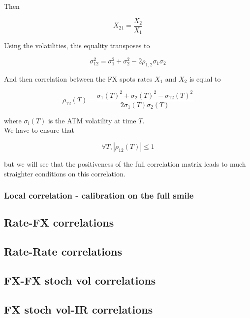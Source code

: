 \documentclass{article}
\begin{document}
\noindent Then 

\begin{equation}
	X_{21} = \frac{X_2}{X_1}
\end{equation}

\noindent Using the volatilities, this equality transposes to 

\begin{equation}
	\sigma_{12} ^2= \sigma_1^2 + \sigma_2^2 - 2 \rho_{1,2} \sigma_1 \sigma_2
\end{equation}

\noindent And then correlation between the FX spots rates $X_1$ and $X_2$ is equal to 

\begin{equation}
	\rho_{12}(T) = \frac{\sigma_1(T)^2 + \sigma_2(T)^2 - \sigma_{12}(T)^2}{2 \sigma_1(T) \sigma_2(T)}
\end{equation} 

\noindent where $\sigma_i(T)$ is the ATM volatility at time $T$.\\

\noindent We have to ensure that 

\begin{equation}
	\forall T, |\rho_{12}(T)| \leq 1
\end{equation}

\noindent but we will see that the positiveness of the full correlation matrix leads to much straighter conditions on this correlation.

\subsubsection{Local correlation - calibration on the full smile}

\subsection{Rate-FX correlations}

\subsection{Rate-Rate correlations}

\subsection{FX-FX stoch vol correlations}

\subsection{FX stoch vol-IR correlations}
\end{document}
